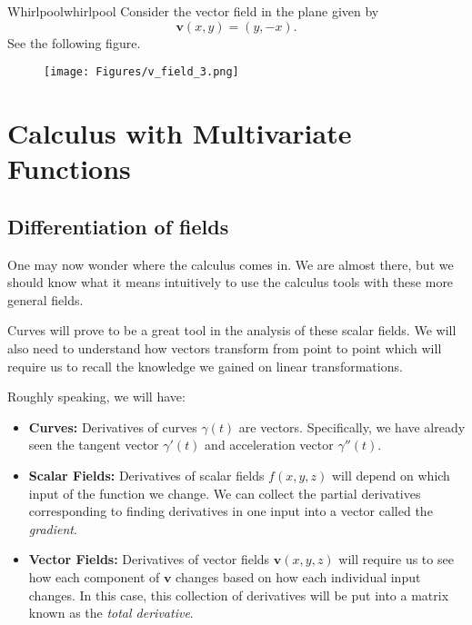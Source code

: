         \begin{ex}{Whirlpool}{whirlpool}
        Consider the vector field in the plane given by
        \[
        \mathbf{v}(x,y)=(y,-x).
        \]
        See the following figure.
        \begin{figure}[H]
            \centering
            \texttt{[image: Figures/v\_field\_3.png]}
        \end{figure}
        \end{ex}
        
    \chapter{Calculus with Multivariate Functions}
        
        \section{Differentiation of fields}
        One may now wonder where the calculus comes in.  We are almost there, but we should know what it means intuitively to use the calculus tools with these more general fields.
        
        Curves will prove to be a great tool in the analysis of these scalar fields.  We will also need to understand how vectors transform from point to point which will require us to recall the knowledge we gained on linear transformations.
        
        Roughly speaking, we will have:
        \begin{itemize}
            \item \textbf{Curves:} Derivatives of curves $\gamma(t)$ are vectors. Specifically, we have already seen the tangent vector $\gamma'(t)$ and acceleration vector $\gamma''(t)$.
            \item \textbf{Scalar Fields:} Derivatives of scalar fields $f(x,y,z)$ will depend on which input of the function we change.  We can collect the partial derivatives corresponding to finding derivatives in one input into a vector called the \emph{gradient}.
            \item \textbf{Vector Fields:} Derivatives of vector fields $\mathbf{v}(x,y,z)$ will require us to see how each component of $\mathbf{v}$ changes based on how each individual input changes.  In this case, this collection of derivatives will be put into a matrix known as the \emph{total derivative}.
        \end{itemize}
        
